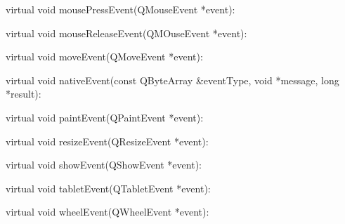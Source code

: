 \par
virtual void mousePressEvent(QMouseEvent *event):

\par
virtual void mouseReleaseEvent(QMOuseEvent *event):

\par
virtual void moveEvent(QMoveEvent *event):

\par
virtual void nativeEvent(const QByteArray \&eventType, void *message, long *result):

\par
virtual void paintEvent(QPaintEvent *event):

\par
virtual void resizeEvent(QResizeEvent *event):

\par
virtual void showEvent(QShowEvent *event):

\par
virtual void tabletEvent(QTabletEvent *event):

\par
virtual void wheelEvent(QWheelEvent *event):







